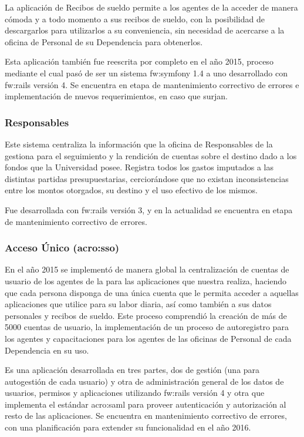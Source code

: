 La aplicación de Recibos de sueldo permite a los agentes de la \unlp acceder de manera cómoda y a todo momento a sus recibos de sueldo, con la posibilidad de descargarlos para utilizarlos a su conveniencia, sin necesidad de acercarse a la oficina de Personal de su Dependencia para obtenerlos.

Esta aplicación también fue reescrita por completo en el año 2015, proceso mediante el cual pasó de ser un sistema \gls{fw:symfony} 1.4 a uno desarrollado con \gls{fw:rails} versión 4. Se encuentra en etapa de mantenimiento correctivo de errores e implementación de nuevos requerimientos, en caso que surjan.


\subsubsection{Responsables}
\label{anexo:detalle-clientes:responsables}

Este sistema centraliza la información que la oficina de Responsables de la \unlp gestiona para el seguimiento y la rendición de cuentas sobre el destino dado a los fondos que la Universidad posee. Registra todos los gastos imputados a las distintas partidas presupuestarias, cerciorándose que no existan inconsistencias entre los montos otorgados, su destino y el uso efectivo de los mismos.

Fue desarrollada con \gls{fw:rails} versión 3, y en la actualidad se encuentra en etapa de mantenimiento correctivo de errores.


\subsubsection{Acceso Único (\gls{acro:sso})}
\label{anexo:detalle-clientes:sso}

En el año 2015 se implementó de manera global la centralización de cuentas de usuario de los agentes de la \unlp para las aplicaciones que nuestra \direccionDesarrollo realiza, haciendo que cada persona disponga de una única cuenta que le permita acceder a aquellas aplicaciones que utilice para su labor diaria, así como también a sus datos personales y recibos de sueldo. Este proceso comprendió la creación de más de 5000 cuentas de usuario, la implementación de un proceso de autoregistro para los agentes y capacitaciones para los agentes de las oficinas de Personal de cada Dependencia en su uso.

Es una aplicación desarrollada en tres partes, dos de gestión (una para autogestión de cada usuario) y otra de administración general de los datos de usuarios, permisos y aplicaciones utilizando \gls{fw:rails} versión 4 y otra que implementa el estándar \gls{acro:saml} para proveer autenticación y autorización al resto de las aplicaciones. Se encuentra en mantenimiento correctivo de errores, con una planificación para extender su funcionalidad en el año 2016.


